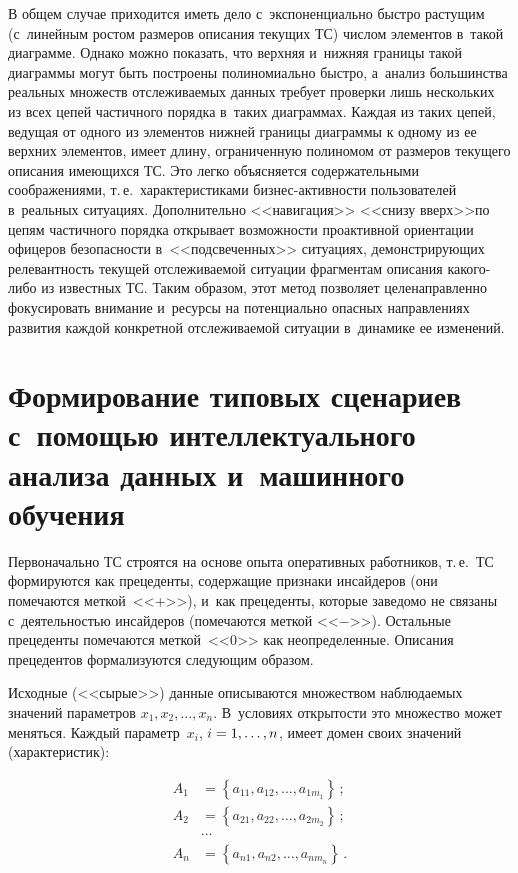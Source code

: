 \begin{multicols}{2}
   В общем случае приходится иметь дело с~экспоненциально быстро 
растущим (с~линейным ростом размеров описания текущих ТС) числом 
элементов в~такой диаграмме. Однако можно показать, что верхняя и~нижняя 
границы такой диаграммы могут быть построены полиномиально быстро, 
а~анализ большинства реальных множеств от\-сле\-жи\-ва\-емых данных требует 
проверки лишь нескольких из всех цепей частичного порядка в~таких 
диаграммах. Каждая из таких цепей, ведущая от одного из элементов нижней 
границы диаграммы к одному из ее верхних элементов, имеет длину, 
ограниченную полиномом от размеров текущего описания имеющихся ТС. Это 
легко объясняется содержательными соображениями, т.\,е.\ характеристиками 
биз\-нес-ак\-тив\-ности пользователей в~реальных ситуациях. Дополнительно 
<<навигация>> <<снизу вверх>>\linebreak по цепям частичного порядка открывает 
возможности проактивной ориентации офицеров безопас\-ности 
в~<<подсвеченных>> ситуациях, де\-мон\-ст\-ри\-ру\-ющих релевантность текущей 
отслеживаемой ситуа\-ции фрагментам описания ка\-ко\-го-ли\-бо из известных 
ТС. Таким образом, этот метод поз\-во\-ля\-ет целенаправленно фокусировать 
внимание и~ресурсы на потенциально опасных направлениях развития каждой 
конкретной отслеживаемой ситуации в~динамике ее изменений.
   
  \section{Формирование типовых сценариев с~помощью интеллектуального анализа данных и~машинного обучения}
    
    Первоначально ТС строятся на основе опыта оперативных работников, т.\,е.\
     ТС формируются как прецеденты, содержащие признаки инсайдеров (они 
помечаются меткой~<<+>>), и~как прецеденты, которые заведомо не связаны 
с~деятельностью инсайдеров (помечаются меткой <<$-$>>). Остальные 
прецеденты помечаются меткой~<<0>> как неопределенные. Описания 
прецедентов формализуются следующим образом.
    
  Исходные (<<сырые>>) данные описываются множеством наблюдаемых 
значений параметров $x_1, x_2,\ldots , x_n$. В~условиях открытости это 
множество может меняться. Каждый параметр~$x_i$, $i\hm=1,\ldots , n$, имеет 
домен своих значений (характеристик): 

\vspace*{-7pt}

\noindent
  \begin{align*}
  A_1&=\left\{ a_{11}, a_{12}, \ldots , a_{1m_1}\right\}\,;\\
  A_2&=\left\{ a_{21}, a_{22}, \ldots , a_{2m_2}\right\}\,;\\
  &\cdots\\
  A_n&=\left\{ a_{n1}, a_{n2}, \ldots , a_{nm_n}\right\}\,.\\
  \end{align*}
  

\end{multicols}
